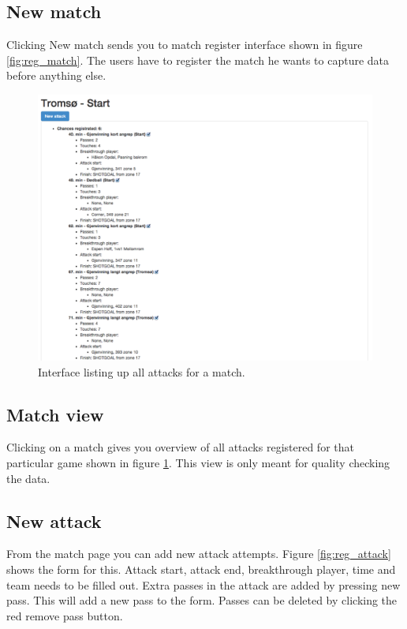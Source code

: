 \subsection{New match}
Clicking New match sends you to match register interface shown in figure \ref{fig:reg_match}. The users have to register the match he wants to capture data before anything else.


\begin{figure}[H]
\centering
\includegraphics[width=1\textwidth]{images/general/all_attacks.png}
\caption{Interface listing up all attacks for a match.}
\label{fig:all_attacks}
\end{figure}

\subsection{Match view}

Clicking on a match gives you overview of all attacks registered for that particular game shown in figure \ref{fig:all_attacks}. This view is only meant for quality checking the data.

\subsection{New attack}
From the match page you can add new attack attempts. Figure \ref{fig:reg_attack} shows the form for this. Attack start, attack end, breakthrough player, time and team needs to be filled out. Extra passes in the attack are added by pressing new pass. This will add a new pass to the form. Passes can be deleted by clicking the red remove pass button.

